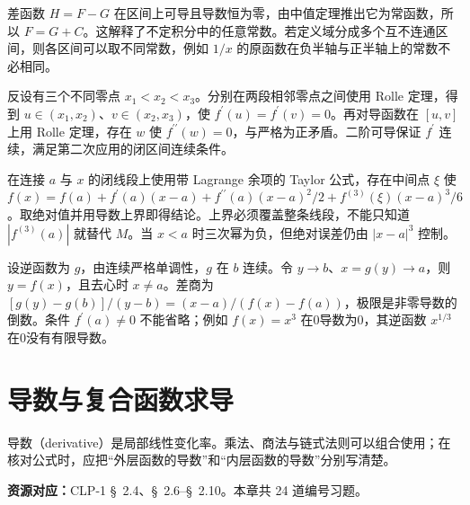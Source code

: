 \documentclass[12pt,fontset=fandol]{ctexart}
\begin{document}
\begin{solve}\label{ans:c7q17}
差函数 $H=F-G$ 在区间上可导且导数恒为零，由中值定理推出它为常函数，所以 $F=G+C$。这解释了不定积分中的任意常数。若定义域分成多个互不连通区间，则各区间可以取不同常数，例如 $1/x$ 的原函数在负半轴与正半轴上的常数不必相同。
\end{solve}

\begin{solve}\label{ans:c7q18}
反设有三个不同零点 $x_1<x_2<x_3$。分别在两段相邻零点之间使用 Rolle 定理，得到 $u\in(x_1,x_2)$、$v\in(x_2,x_3)$，使 $f^{\prime}(u)=f^{\prime}(v)=0$。再对导函数在 $[u,v]$ 上用 Rolle 定理，存在 $w$ 使 $f^{\prime\prime}(w)=0$，与严格为正矛盾。二阶可导保证 $f^{\prime}$ 连续，满足第二次应用的闭区间连续条件。
\end{solve}

\begin{solve}\label{ans:c7q19}
在连接 $a$ 与 $x$ 的闭线段上使用带 Lagrange 余项的 Taylor 公式，存在中间点 $\xi$ 使 $f(x)=f(a)+f^{\prime}(a)(x-a)+f^{\prime\prime}(a)(x-a)^2/2+f^{(3)}(\xi)(x-a)^3/6$。取绝对值并用导数上界即得结论。上界必须覆盖整条线段，不能只知道 $|f^{(3)}(a)|$ 就替代 $M$。当 $x<a$ 时三次幂为负，但绝对误差仍由 $|x-a|^3$ 控制。
\end{solve}

\begin{solve}\label{ans:c7q20}
设逆函数为 $g$，由连续严格单调性，$g$ 在 $b$ 连续。令 $y\to b$、$x=g(y)\to a$，则 $y=f(x)$，且去心时 $x\ne a$。差商为 $[g(y)-g(b)]/(y-b)=(x-a)/(f(x)-f(a))$，极限是非零导数的倒数。条件 $f^{\prime}(a)\ne0$ 不能省略；例如 $f(x)=x^3$ 在0导数为0，其逆函数 $x^{1/3}$ 在0没有有限导数。
\end{solve}

\clearpage
\section{导数与复合函数求导}\label{sec:ch8}
导数（derivative）是局部线性变化率。乘法、商法与链式法则可以组合使用；在核对公式时，应把“外层函数的导数”和“内层函数的导数”分别写清楚。

\textbf{资源对应：}CLP-1 \S~2.4、\S~2.6--\S~2.10。本章共 24 道编号习题。
\end{document}
